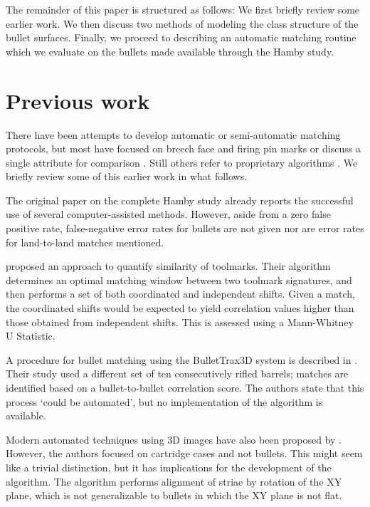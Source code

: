 \documentclass[aoas, preprint]{imsart}\usepackage[]{graphicx}\usepackage[]{color}
\begin{document}
The remainder of this paper is structured as follows: We first briefly review some earlier work. We then discuss two methods of modeling the class structure of the bullet surfaces. Finally, we proceed to describing an automatic matching routine which we evaluate on the bullets made available through the Hamby study.

\section{Previous work}

There have been attempts to develop automatic or semi-automatic matching protocols, but most have focused on breech face and firing pin marks \citep[e.g.][]{riva:2014} or discuss a single attribute for comparison \citep[e.g.][]{vorburger:2011, chu:2011}. Still others refer to proprietary algorithms \citep{roberge:2006}. We briefly review some of this earlier work in what follows.

The original paper on the complete Hamby study already reports the successful use of several computer-assisted methods. However, aside from a zero false positive rate, false-negative error rates for bullets are not given nor are error rates for land-to-land matches mentioned. 
 
\citet{lock2013significance} proposed an approach to quantify similarity of toolmarks. Their algorithm determines an optimal matching window between two toolmark signatures, and then performs a set of both coordinated and independent shifts. Given a match, the coordinated shifts would be expected to yield correlation values higher than those obtained from independent shifts. This is assessed using a Mann-Whitney U Statistic. 

A procedure for bullet matching using the BulletTrax3D system is described in \citet{roberge:2006}. Their study used a different set of ten consecutively rifled barrels; matches are identified based on a bullet-to-bullet correlation score. The authors state that this process `could be automated', but no implementation of the algorithm is available. 

Modern automated techniques using 3D images have also been proposed by \citet{riva:2014}. However, the authors focused on cartridge cases and not bullets. This might seem like a trivial distinction, but it has implications for the development of the algorithm. The algorithm performs alignment of striae by rotation of the XY plane, which is not generalizable to bullets in which the XY plane is not flat. 
\end{document}
